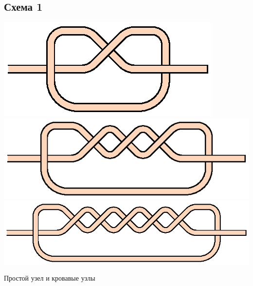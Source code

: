 \subsection{Схема 1}
\graphicspath{{\currentpath}}

\includegraphics[scale=0.5]{images/s-01-a0.eps}
\includegraphics[scale=0.5]{images/s-01-a1.eps}
\includegraphics[scale=0.5]{images/s-01-a2.eps}

Простой узел и кровавые узлы